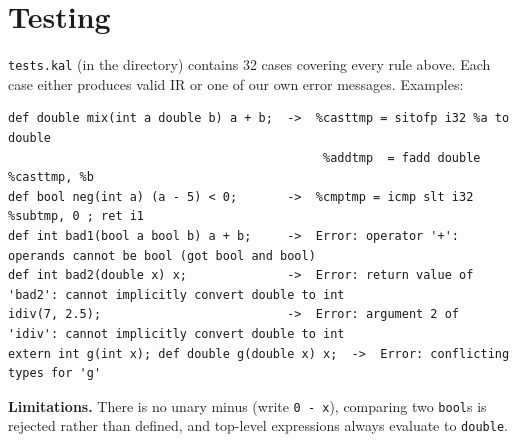 \documentclass[10pt,a4paper]{article}
\newcommand{\code}[1]{\texttt{#1}}
\begin{document}
\section{Testing}
\code{tests.kal} (in the directory) contains 32 cases covering every rule above.
Each case either produces valid IR or one of our own error messages. Examples:

\begin{lstlisting}
def double mix(int a double b) a + b;  ->  %casttmp = sitofp i32 %a to double
                                            %addtmp  = fadd double %casttmp, %b
def bool neg(int a) (a - 5) < 0;       ->  %cmptmp = icmp slt i32 %subtmp, 0 ; ret i1
def int bad1(bool a bool b) a + b;     ->  Error: operator '+': operands cannot be bool (got bool and bool)
def int bad2(double x) x;              ->  Error: return value of 'bad2': cannot implicitly convert double to int
idiv(7, 2.5);                          ->  Error: argument 2 of 'idiv': cannot implicitly convert double to int
extern int g(int x); def double g(double x) x;  ->  Error: conflicting types for 'g'
\end{lstlisting}

\textbf{Limitations.} There is no unary minus (write \code{0 - x}), comparing two
\code{bool}s is rejected rather than defined, and top-level expressions always
evaluate to \code{double}.
\end{document}
